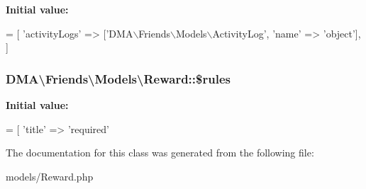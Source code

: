 {\bfseries Initial value\-:}
\begin{DoxyCode}
= [ 
        \textcolor{stringliteral}{'activityLogs'}  => [\textcolor{stringliteral}{'DMA\(\backslash\)Friends\(\backslash\)Models\(\backslash\)ActivityLog'}, \textcolor{stringliteral}{'name'} => \textcolor{stringliteral}{'object'}],
    ]
\end{DoxyCode}
\hypertarget{classDMA_1_1Friends_1_1Models_1_1Reward_ab0f53a612317c68e59e32e0c4a4a2590}{
\subsubsection[{\$rules}]{\setlength{\rightskip}{0pt plus 5cm}D\-M\-A\textbackslash{}\-Friends\textbackslash{}\-Models\textbackslash{}\-Reward\-::\$rules}}\label{classDMA_1_1Friends_1_1Models_1_1Reward_ab0f53a612317c68e59e32e0c4a4a2590}
{\bfseries Initial value\-:}
\begin{DoxyCode}
= [ 
        \textcolor{stringliteral}{'title'} => \textcolor{stringliteral}{'required'}
\end{DoxyCode}


The documentation for this class was generated from the following file\-:\begin{DoxyCompactItemize}
\item 
models/Reward.\-php\end{DoxyCompactItemize}
